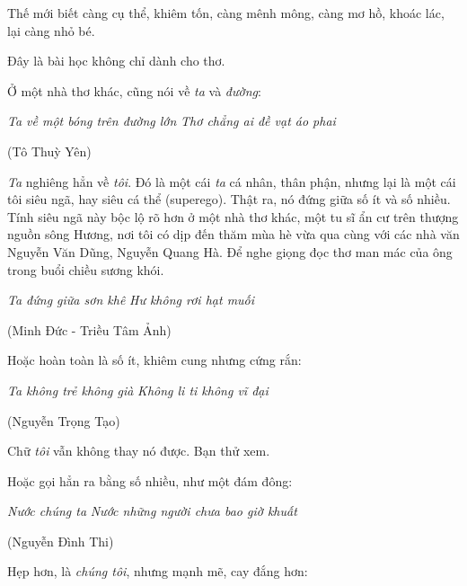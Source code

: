 \documentclass[../main.tex]{subfiles}
\begin{document}
\begin{multicols}{2}
Thế mới biết càng cụ thể, khiêm tốn, càng mênh mông, càng mơ hồ, khoác lác, lại càng nhỏ bé.  
 
Đây là bài học không chỉ dành cho thơ.  
 
Ở một nhà thơ khác, cũng nói về \textit{ta }và \textit{đường}: 
\begin{blockquote}
        
\textit{Ta về một bóng trên đường lớn} 
\textit{Thơ chẳng ai đề vạt áo phai } 
        
(Tô Thuỳ Yên) 

\end{blockquote}
 
\textit{Ta} nghiêng hẳn về \textit{tôi}. Đó là một cái \textit{ta }cá nhân, thân phận, nhưng lại là một cái tôi siêu ngã, hay siêu cá thể (superego). Thật ra, nó đứng giữa số ít và số nhiều. Tính siêu ngã này bộc lộ rõ hơn ở một nhà thơ khác, một tu sĩ ẩn cư trên thượng nguồn sông Hương, nơi tôi có dịp đến thăm mùa hè vừa qua cùng với các nhà văn Nguyễn Văn Dũng, Nguyễn Quang Hà. Để nghe giọng đọc thơ man mác của ông trong buổi chiều sương khói.  
\begin{blockquote}
        
\textit{Ta đứng giữa sơn khê} 
\textit{Hư không rơi hạt muối} 
        
(Minh Đức - Triều Tâm Ảnh)  

\end{blockquote}
 
Hoặc hoàn toàn là số ít, khiêm cung nhưng cứng rắn:         
\begin{blockquote}
        
\textit{Ta không trẻ không già}        
\textit{Không li ti không vĩ đại}        
        
(Nguyễn Trọng Tạo) 

\end{blockquote}
 
Chữ \textit{tôi} vẫn không thay nó được. Bạn thử xem. 
 
Hoặc gọi hẳn ra bằng số nhiều, như một đám đông: 
\begin{blockquote}
        
\textit{Nước chúng ta} 
\textit{Nước những người chưa bao giờ khuất} 
        
(Nguyễn Đình Thi) 

\end{blockquote}
 
Hẹp hơn, là \textit{chúng tôi}, nhưng mạnh mẽ, cay đắng hơn: 
\begin{blockquote}
 

\end{blockquote}
\end{multicols}
\end{document}
